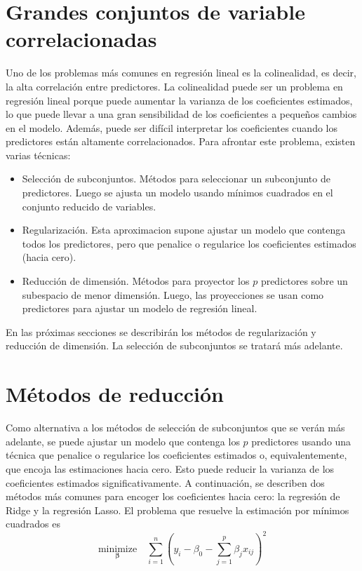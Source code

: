 \section{Grandes conjuntos de variable correlacionadas}

Uno de los problemas más comunes en regresión lineal es la colinealidad, es decir, la alta correlación entre predictores. La colinealidad puede ser un problema en regresión lineal porque puede aumentar la varianza de los coeficientes estimados, lo que puede llevar a una gran sensibilidad de los coeficientes a pequeños cambios en el modelo. Además, puede ser difícil interpretar los coeficientes cuando los predictores están altamente correlacionados. Para afrontar este problema, existen varias técnicas: 

\begin{itemize}
    \item Selección de subconjuntos. Métodos para seleccionar un subconjunto de predictores. Luego se ajusta un modelo usando mínimos cuadrados en el conjunto reducido de variables.
    \item Regularización. Esta aproximacion supone ajustar un modelo que contenga todos los predictores, pero que penalice o regularice los coeficientes estimados (hacia cero).
    \item Reducción de dimensión. Métodos para proyector los $p$ predictores sobre un subespacio de menor dimensión. Luego, las proyecciones se usan como predictores para ajustar un modelo de regresión lineal.
\end{itemize}

En las próximas secciones se describirán los métodos de regularización y reducción de dimensión. La selección de subconjuntos se tratará más adelante. 


\section{Métodos de reducción}

Como alternativa a los métodos de selección de subconjuntos que se verán más adelante, se puede ajustar un modelo que contenga los $p$ predictores usando una técnica que penalice o regularice los coeficientes estimados o, equivalentemente, que encoja las estimaciones hacia cero. Esto puede reducir la varianza de los coeficientes estimados significativamente. A continuación, se describen dos métodos más comunes para encoger los coeficientes hacia cero: la regresión de Ridge y la regresión Lasso. El problema que resuelve la estimación por mínimos cuadrados es 
\begin{equation}
\underset{\boldsymbol{\beta}}{\text{minimize}} \quad \sum_{i=1}^{n}\left(y_i - \beta_0 - \sum_{j=1}^{p}\beta_j x_{ij}\right)^2
\end{equation}

